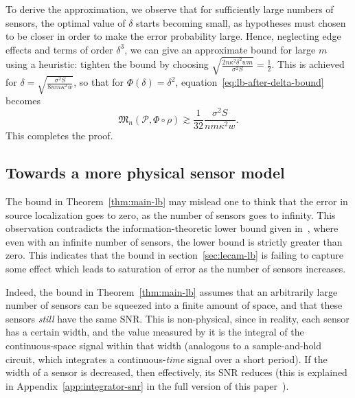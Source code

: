\documentclass[conference]{IEEEtran}
\newcommand{\Phiorho}{\Phi\!\circ\!\rho}
\begin{document}
\begin{IEEEproof}
To derive the approximation, we observe that for sufficiently large numbers of
sensors, the optimal value of $\delta$ starts becoming small, as hypotheses
must chosen to be closer in order to make the error probability large. Hence,
neglecting edge effects and terms of order $\delta^3$, we can give an
approximate bound for large $m$ using a heuristic: tighten the bound by
choosing $\sqrt{\frac{2n\kappa^2\delta^2wm}{\sigma^2 S}} = \frac{1}{2}$. This
is achieved for $\delta = \sqrt{\frac{\sigma^2 S}{8nm\kappa^2 w}}$, so that for
$\Phi(\delta) = \delta^2$, equation~\eqref{eq:lb-after-delta-bound} becomes
\begin{equation}
	\mathfrak{M}_n(\mathcal{P}, \Phiorho) \gtrsim \frac{1}{32} \frac{\sigma^2 S}{nm\kappa^2 w}.
\end{equation}
This completes the proof.
\end{IEEEproof}

\subsection{Towards a more physical sensor model}
\label{sec:physical-model}

The bound in Theorem~\ref{thm:main-lb} may mislead one to think that the error
in source localization goes to zero, as the number of sensors goes to infinity.
This observation contradicts the information-theoretic lower bound given
in~\cite{Grover2016Fundamental}, where even with an infinite number of sensors,
the lower bound is strictly greater than zero. This indicates that the bound in
section~\ref{sec:lecam-lb} is failing to capture some effect which leads to
saturation of error as the number of sensors increases.

Indeed, the bound in Theorem~\ref{thm:main-lb} assumes that an arbitrarily
large number of sensors can be squeezed into a finite amount of space, and that
these sensors \emph{still} have the same SNR.  This is non-physical, since in
reality, each sensor has a certain width, and the value measured by it is the
integral of the continuous-space signal within that width (analogous to a
sample-and-hold circuit, which integrates a continuous-\emph{time} signal over
a short period). If the width of a sensor is decreased, then effectively, its
SNR reduces (this is explained in Appendix~\ref{app:integrator-snr} in the
full version of this paper~\cite{FullVersion}).

\end{document}
